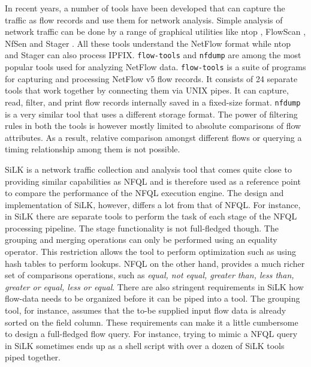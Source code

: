 In recent years, a number of tools have been developed that can capture the
traffic as flow records and use them for network analysis. Simple analysis of
network traffic can be done by a range of graphical utilities like ntop
\cite{ntop:2000}, FlowScan \cite{flowscan:2000}, NfSen \cite{phaag:2006} and
Stager \cite{oslebo:2006}. All these tools understand the NetFlow format while
ntop and Stager can also process \ac{IPFIX}. \texttt{flow-tools} and
\texttt{nfdump} are among the most popular tools used for analyzing NetFlow
data. \texttt{flow-tools} \cite{sromig:2000} is a suite of programs for
capturing and processing NetFlow v5 flow records. It consists of 24 separate
tools that work together by connecting them via UNIX pipes. It can capture,
read, filter, and print flow records internally saved in a fixed-size format.
\texttt{nfdump} \cite{phaag:2006} is a very similar tool that uses a different
storage format. The power of filtering rules in both the tools is however
mostly limited to absolute comparisons of flow attributes. As a result,
relative comparison amongst different flows or querying a timing relationship
among them is not possible.


SiLK \cite{SiLK} is a network traffic collection and analysis tool that comes
quite close to providing similar capabilities as \ac{NFQL} and is therefore
used as a reference point to compare the performance of the \ac{NFQL}
execution engine. The design and implementation of SiLK, however, differs a
lot from that of \ac{NFQL}. For instance, in SiLK there are separate tools to
perform the task of each stage of the \ac{NFQL} processing pipeline. The stage
functionality is not full-fledged though. The grouping and merging operations
can only be performed using an equality operator. This restriction allows the
tool to perform optimization such as using hash tables to perform lookups.
\ac{NFQL} on the other hand, provides a much richer set of comparisons
operations, such as \emph{equal, not equal, greater than, less than, greater
or equal, less or equal}. There are also stringent requirements in SiLK how
flow-data needs to be organized before it can be piped into a tool. The
grouping tool, for instance, assumes that the to-be supplied input flow data
is already sorted on the field column.  These requirements can make it a
little cumbersome to design a full-fledged flow query.  For instance, trying
to mimic a \ac{NFQL} query in SiLK sometimes ends up as a shell script with
over a dozen of SiLK tools piped together.
